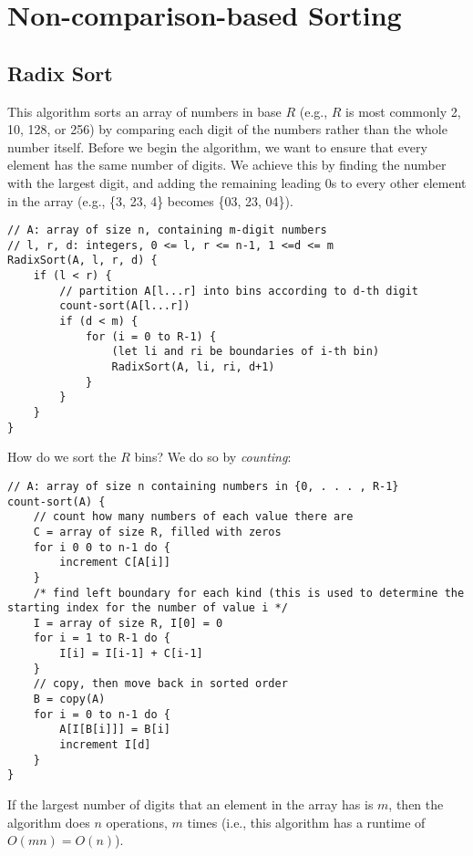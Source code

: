 \documentclass{report}
\begin{document}
\section{Non-comparison-based Sorting}
\subsection{Radix Sort}
This algorithm sorts an array of numbers in base $R$ (e.g., $R$ is most commonly 2, 10, 128, or 256) by comparing each digit of the numbers rather than the whole number itself. Before we begin the algorithm, we want to ensure that every element has the same number of digits. We achieve this by finding the number with the largest digit, and adding the remaining leading 0s to every other element in the array (e.g., \{3, 23, 4\} becomes \{03, 23, 04\}).
\begin{lstlisting}
// A: array of size n, containing m-digit numbers
// l, r, d: integers, 0 <= l, r <= n-1, 1 <=d <= m
RadixSort(A, l, r, d) {
	if (l < r) {
		// partition A[l...r] into bins according to d-th digit
		count-sort(A[l...r])
		if (d < m) {
			for (i = 0 to R-1) {
				(let li and ri be boundaries of i-th bin)
				RadixSort(A, li, ri, d+1)
			}
		}
	}
}
\end{lstlisting}
How do we sort the $R$ bins? We do so by \textit{counting}:
\begin{lstlisting}
// A: array of size n containing numbers in {0, . . . , R-1}
count-sort(A) {
	// count how many numbers of each value there are
	C = array of size R, filled with zeros
	for i 0 0 to n-1 do {
		increment C[A[i]]
	}
	/* find left boundary for each kind (this is used to determine the starting index for the number of value i */
	I = array of size R, I[0] = 0
	for i = 1 to R-1 do {
		I[i] = I[i-1] + C[i-1]
	}
	// copy, then move back in sorted order
	B = copy(A)
	for i = 0 to n-1 do {
		A[I[B[i]]] = B[i]
		increment I[d]
	}
}
\end{lstlisting}
If the largest number of digits that an element in the array has is $m$, then the algorithm does $n$ operations, $m$ times (i.e., this algorithm has a runtime of $O(mn) = O(n)$).
\end{document}
